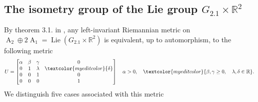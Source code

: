 \documentclass[12pt,a4paper,twoside]{article}
\theoremstyle{definition}
\newcommand{\edit}[1]{\textcolor{myeditcolor}{#1}}
\begin{document}
\subsection{The isometry group of the Lie group $G_{2.1} \times \mathbb{R}^2$}
By theorem 3.1. in \cite{aitbenhaddou2025classification}, any left-invariant Riemannian metric on $\operatorname{A}_{2} \oplus 2\operatorname{A}_1 = \operatorname{Lie}\left(G_{2.1} \times \mathbb{R}^2\right)$ is equivalent, up to automorphism, to the following metric
$$
U = \begin{bmatrix}
\alpha & \beta & \gamma & 0\\
0 & 1 & \lambda & \edit{\delta}\\
0 & 0 & 1 & 0\\
0 & 0 & 0 & 1
\end{bmatrix} \quad \alpha > 0, \quad \edit{\beta, \gamma \geq 0, \quad \lambda, \delta \in \mathbb{R}}.$$
We distinguish \edit{five} cases associated with this metric
\end{document}
